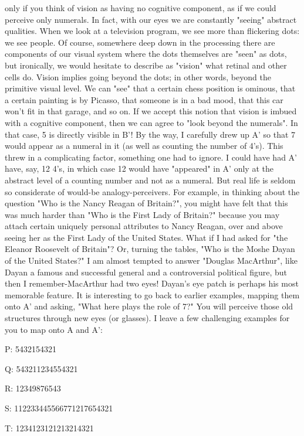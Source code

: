 only if you think of vision as having no cognitive component, as if we could perceive
only numerals. In fact, with our eyes we are constantly "seeing" abstract qualities.
When we look at a television program, we see more than flickering dots: we see
people. Of course, somewhere deep down in the processing there are components of
our visual system where the dots themselves are "seen" as dots, but ironically, we
would hesitate to describe as "vision" what retinal and other cells do. Vision implies
going beyond the dots; in other words, beyond the primitive visual level. We can
"see" that a certain chess position is ominous, that a certain painting is by Picasso,
that someone is in a bad mood, that this car won't fit in that garage, and so on. If we
accept this notion that vision is imbued with a cognitive component, then we can
agree to "look beyond the numerals". In that case, 5 is directly visible in B'!
        By the way, I carefully drew up A' so that 7 would appear as a numeral in it
(as well as counting the number of 4's). This threw in a complicating factor,
something one had to ignore. I could have had A' have, say, 12 4's, in which case 12
would have "appeared" in A' only at the abstract level of a counting number and not
as a numeral. But real life is seldom so considerate of would-be analogy-perceivers.
For example, in thinking about the question "Who is the Nancy Reagan of Britain?",
you might have felt that this was much harder than "Who is the First Lady of
Britain?" because you may attach certain uniquely personal attributes to Nancy
Reagan, over and above seeing her as the First Lady of the United States. What if I
had asked for "the Eleanor Roosevelt of Britain"? Or, turning the tables, "Who is the
Moshe Dayan of the United States?" I am almost tempted to answer "Douglas
MacArthur", like Dayan a famous and successful general and a controversial political
figure, but then I remember-MacArthur had two eyes! Dayan's eye patch is perhaps
his most memorable feature.
        It is interesting to go back to earlier examples, mapping them onto A' and
asking, "What here plays the role of 7?" You will perceive those old structures
through new eyes (or glasses). I leave a few challenging examples for you to map
onto A and A':

       P: 5432154321

       Q: 543211234554321

       R: 12349876543

       S:   112233445566771217654321

       T:   1234123121213214321

